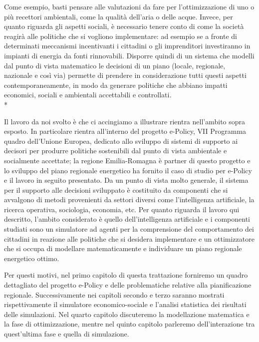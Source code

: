 Come esempio, basti pensare alle valutazioni da fare per l'ottimizzazione di uno o più recettori ambientali, come la qualità dell'aria o delle acque. Invece, per quanto riguarda gli aspetti sociali, è necessario tenere conto di come la società reagirà alle politiche che si vogliono implementare: ad esempio se a fronte di determinati meccanismi incentivanti i cittadini o gli imprenditori investiranno in impianti di energia da fonti rinnovabili. Disporre quindi di un sistema che modelli dal punto di vista matematico le decisioni di un piano (locale, regionale, nazionale e così via) permette di prendere in considerazione tutti questi aspetti contemporaneamente, in modo da generare politiche che abbiano impatti economici, sociali e ambientali accettabili e controllati. 
\\*

Il lavoro da noi svolto è che ci accingiamo a illustrare rientra nell'ambito sopra esposto. In particolare rientra all'interno del progetto e-Policy, VII Programma quadro dell'Unione Europea, dedicato allo sviluppo di sistemi di supporto ai decisori per produrre politiche sostenibili dal punto di vista ambientale e socialmente accettate; la regione Emilia-Romagna è partner di questo progetto e lo sviluppo del piano regionale energetico ha fornito il caso di studio per e-Policy e il lavoro in seguito presentato. Da un punto di vista molto generale, il sistema per il supporto alle decisioni sviluppato è costituito da componenti che si avvalgono di metodi provenienti da settori diversi come l'intelligenza artificiale, la ricerca operativa, sociologia, economia, etc. Per quanto riguarda il lavoro qui descritto, l'ambito considerato è quello dell'intelligenza artificiale e i componenti studiati sono un simulatore ad agenti per la comprensione del comportamento dei cittadini in reazione alle politiche che si desidera implementare e un ottimizzatore che si occupa di modellare matematicamente e individuare un piano regionale energetico ottimo. 

Per questi motivi, nel primo capitolo di questa trattazione forniremo un quadro dettagliato del progetto e-Policy e delle problematiche relative alla pianificazione regionale. 
Successivamente nei capitoli secondo e terzo saranno mostrati rispettivamente il simulatore economico-sociale e l'analisi statistica dei risultati delle simulazioni. 
Nel quarto capitolo discuteremo la modellazione matematica e la fase di ottimizzazione, mentre nel quinto capitolo parleremo dell'interazione tra quest'ultima fase e quella di simulazione.

%
